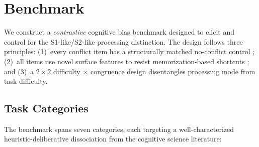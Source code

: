 
\section{Benchmark}
\label{sec:benchmark}

We construct a \emph{contrastive} cognitive bias benchmark designed to elicit
and control for the S1-like/S2-like processing distinction.  The design follows
three principles: (1)~every conflict item has a structurally matched no-conflict
control \citep{deneys2012bias}; (2)~all items use novel surface features to
resist memorization-based shortcuts \citep{hagendorff2023human}; and (3)~a $2
\times 2$ difficulty $\times$ congruence design disentangles processing mode
from task difficulty.

\subsection{Task Categories}

The benchmark spans seven categories, each targeting a well-characterized
heuristic-deliberative dissociation from the cognitive science literature:

